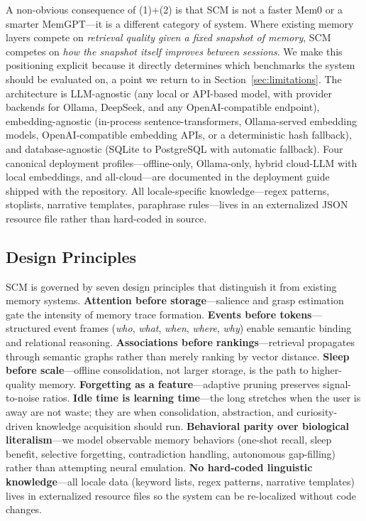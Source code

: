 \documentclass[11pt,twocolumn]{article}
\begin{document}
A non-obvious consequence of (1)+(2) is that SCM is not a faster Mem0 or a smarter MemGPT---it is a different category of system. Where existing memory layers compete on \emph{retrieval quality given a fixed snapshot of memory}, SCM competes on \emph{how the snapshot itself improves between sessions}. We make this positioning explicit because it directly determines which benchmarks the system should be evaluated on, a point we return to in Section~\ref{sec:limitations}. The architecture is LLM-agnostic (any local or API-based model, with provider backends for Ollama, DeepSeek, and any OpenAI-compatible endpoint), embedding-agnostic (in-process sentence-transformers, Ollama-served embedding models, OpenAI-compatible embedding APIs, or a deterministic hash fallback), and database-agnostic (SQLite to PostgreSQL with automatic fallback). Four canonical deployment profiles---offline-only, Ollama-only, hybrid cloud-LLM with local embeddings, and all-cloud---are documented in the deployment guide shipped with the repository. All locale-specific knowledge---regex patterns, stoplists, narrative templates, paraphrase rules---lives in an externalized JSON resource file rather than hard-coded in source.

\subsection{Design Principles}

SCM is governed by seven design principles that distinguish it from existing memory systems. \textbf{Attention before storage}---salience and grasp estimation gate the intensity of memory trace formation. \textbf{Events before tokens}---structured event frames (\textit{who}, \textit{what}, \textit{when}, \textit{where}, \textit{why}) enable semantic binding and relational reasoning. \textbf{Associations before rankings}---retrieval propagates through semantic graphs rather than merely ranking by vector distance. \textbf{Sleep before scale}---offline consolidation, not larger storage, is the path to higher-quality memory. \textbf{Forgetting as a feature}---adaptive pruning preserves signal-to-noise ratios. \textbf{Idle time is learning time}---the long stretches when the user is away are not waste; they are when consolidation, abstraction, and curiosity-driven knowledge acquisition should run. \textbf{Behavioral parity over biological literalism}---we model observable memory behaviors (one-shot recall, sleep benefit, selective forgetting, contradiction handling, autonomous gap-filling) rather than attempting neural emulation. \textbf{No hard-coded linguistic knowledge}---all locale data (keyword lists, regex patterns, narrative templates) lives in externalized resource files so the system can be re-localized without code changes.
\end{document}
